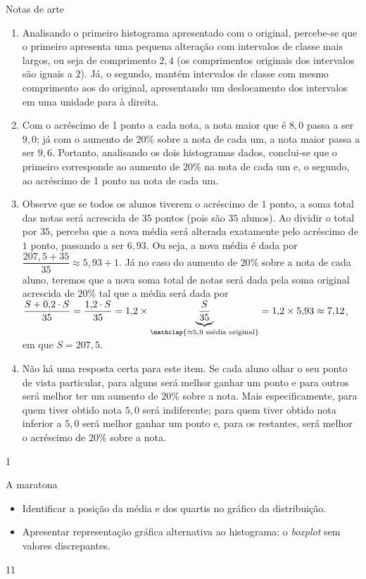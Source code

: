 \begin{answer}{Notas de arte}
{
\begin{enumerate}
\item Analisando o primeiro histograma apresentado com o original, percebe-se que o primeiro apresenta uma pequena alteração com intervalos de classe mais largos, ou seja de comprimento $2{,}4$ (os comprimentos originais dos intervalos são iguais a $2$). Já, o segundo, mantém intervalos de classe com mesmo comprimento aos do original, apresentando um deslocamento dos intervalos em uma unidade para à direita.

\item Com o acréscimo de 1 ponto a cada nota, a nota maior que é $8{,}0$ passa a ser $9{,}0$; já com o aumento de $20\%$ sobre a nota de cada um, a nota maior passa a ser $9{,}6$. Portanto, analisando os dois histogramas dados, conclui-se que o primeiro corresponde ao aumento de $20\%$ na nota de cada um e, o segundo, ao acréscimo de 1 ponto na nota de cada um.

\item Observe que se todos os alunos tiverem o acréscimo de $1$ ponto, a soma total das notas será acrescida de $35$ pontos (pois são $35$ alunos). Ao dividir o total por $35$, perceba que a nova média será alterada exatamente pelo acréscimo de $1$ ponto, passando a ser $6{,}93$. Ou seja, a nova média é dada por $\dfrac{207{,}5+35}{35}\approx5{,}93+1$. Já no caso do aumento de $20\%$ sobre a nota de cada aluno, teremos que a nova soma total de notas será dada pela soma original acrescida de $20\%$ tal que a média será dada por $\dfrac{S+0{,}2\cdot S}{35}=\dfrac{1{,}2\cdot S}{35}=1{,}2\times \underbrace{\frac{S}{35}}_{\mathclap{\approx5{,}9\text{ média original}}}=1{,}2\times5{,}93\approx7{,}12$, em que $S=207{,}5$.

\item Não há uma resposta certa para este item. Se cada aluno olhar o seu ponto de vista particular, para alguns será melhor ganhar um ponto e para outros será melhor ter um aumento de $20\%$ sobre a nota. Mais especificamente, para quem tiver obtido nota $5{,}0$ será indiferente; para quem tiver obtido nota inferior a $5{,}0$ será melhor ganhar um ponto e, para os restantes, será melhor o acréscimo de $20\%$ sobre a nota.
\end{enumerate}
}{1}
\end{answer}
\clearmargin
\begin{objectives}{A maratona}
{
\begin{itemize}
\item Identificar a posição da média e dos quartis no gráfico da distribuição.
\item Apresentar representação gráfica alternativa ao histograma: o \textit{boxplot} sem valores discrepantes.
\end{itemize}
}{1}{1}
\end{objectives}
